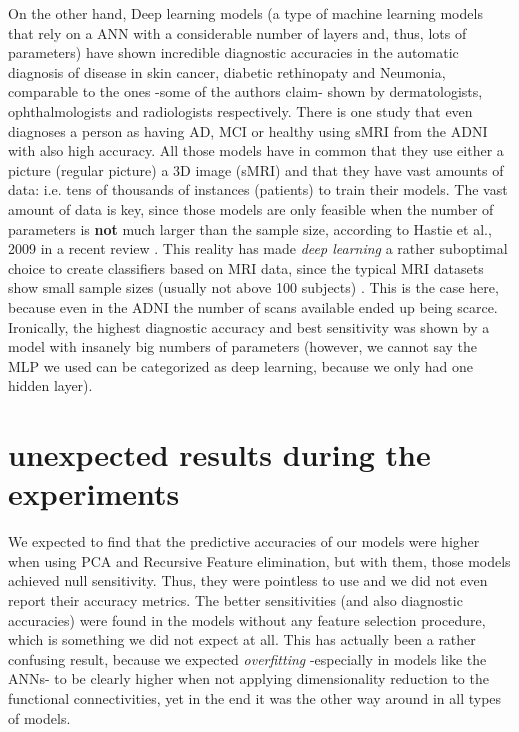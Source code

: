 \documentclass[a4paper,12pt]{elsarticle}  %
\begin{document}
	On the other hand, Deep learning models (a type of machine learning models that rely on a ANN with a considerable number of layers and, thus, lots of parameters) have shown incredible diagnostic accuracies in the automatic diagnosis of disease in skin cancer\cite{Esteva2017115, Kuprel2017yt}, diabetic rethinopaty\cite{Gulshan20162402, retinopatia_diabetica} and Neumonia\cite{2017arXiv171105225R}, comparable to the ones -some of the authors claim- shown by dermatologists, ophthalmologists and radiologists respectively. There is one study that even diagnoses a person as having AD, MCI or healthy using sMRI from the ADNI \cite{Payan2015355} with also high accuracy. All those models have in common that they use either a picture (regular picture) a 3D image (sMRI) and that they have vast amounts of data: i.e. tens of thousands of instances (patients) to train their models. The vast amount of data is key, since those models are only feasible when the number of parameters is \textbf{not} much larger than the sample size, according to Hastie et al., 2009 in a recent review \cite{Varoquaux2017166}. This reality has made \textit{deep learning} a rather suboptimal choice to create classifiers based on MRI data, since the typical MRI datasets show small sample sizes (usually not above 100 subjects) \cite{Arbabshirani2017137}. This is the case here, because even in the ADNI the number of scans available ended up being scarce. Ironically, the highest diagnostic accuracy and best sensitivity was shown by a model with insanely big numbers of parameters (however, we cannot say the MLP we used can be categorized as deep learning, because we only had one hidden layer).

	
	
	
	\section{unexpected results during the experiments} %
	\label{sec:unexpected}
	
	We expected to find that the predictive accuracies of our models were higher when using PCA and Recursive Feature elimination, but with them, those models achieved null sensitivity. Thus, they were pointless to use and we did not even report their accuracy metrics. The better sensitivities (and also diagnostic accuracies) were found in the models without any feature selection procedure, which is something we did not expect at all. This has actually been a rather confusing result, because we expected \textit{overfitting} -especially in models like the ANNs- to be clearly higher when not applying dimensionality reduction to the functional connectivities, yet in the end it was the other way around in all types of models.
	
\end{document}
